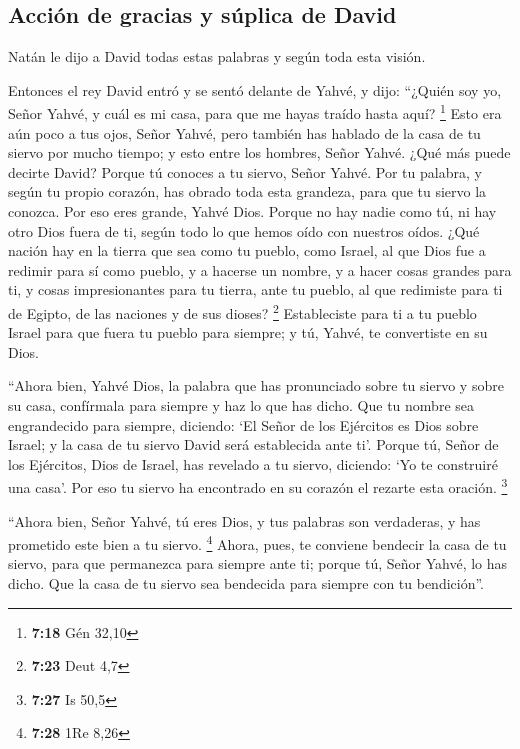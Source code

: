 \hypertarget{acciuxf3n-de-gracias-y-suxfaplica-de-david}{%
\subsection{Acción de gracias y súplica de
David}\label{acciuxf3n-de-gracias-y-suxfaplica-de-david}}

 Natán le dijo a David todas estas palabras y según toda
esta visión.

 Entonces el rey David entró y se sentó delante de Yahvé,
y dijo: ``¿Quién soy yo, Señor Yahvé, y cuál es mi casa, para que me
hayas traído hasta aquí? \footnote{\textbf{7:18} Gén 32,10}
 Esto era aún poco a tus ojos, Señor Yahvé, pero también
has hablado de la casa de tu siervo por mucho tiempo; y esto entre los
hombres, Señor Yahvé.  ¿Qué más puede decirte David?
Porque tú conoces a tu siervo, Señor Yahvé.  Por tu
palabra, y según tu propio corazón, has obrado toda esta grandeza, para
que tu siervo la conozca.  Por eso eres grande, Yahvé
Dios. Porque no hay nadie como tú, ni hay otro Dios fuera de ti, según
todo lo que hemos oído con nuestros oídos.  ¿Qué nación
hay en la tierra que sea como tu pueblo, como Israel, al que Dios fue a
redimir para sí como pueblo, y a hacerse un nombre, y a hacer cosas
grandes para ti, y cosas impresionantes para tu tierra, ante tu pueblo,
al que redimiste para ti de Egipto, de las naciones y de sus dioses?
\footnote{\textbf{7:23} Deut 4,7}  Estableciste para ti a
tu pueblo Israel para que fuera tu pueblo para siempre; y tú, Yahvé, te
convertiste en su Dios.

 ``Ahora bien, Yahvé Dios, la palabra que has pronunciado
sobre tu siervo y sobre su casa, confírmala para siempre y haz lo que
has dicho.  Que tu nombre sea engrandecido para siempre,
diciendo: `El Señor de los Ejércitos es Dios sobre Israel; y la casa de
tu siervo David será establecida ante ti'.  Porque tú,
Señor de los Ejércitos, Dios de Israel, has revelado a tu siervo,
diciendo: `Yo te construiré una casa'. Por eso tu siervo ha encontrado
en su corazón el rezarte esta oración. \footnote{\textbf{7:27} Is 50,5}

 ``Ahora bien, Señor Yahvé, tú eres Dios, y tus palabras
son verdaderas, y has prometido este bien a tu siervo. \footnote{\textbf{7:28}
  1Re 8,26}  Ahora, pues, te conviene bendecir la casa de
tu siervo, para que permanezca para siempre ante ti; porque tú, Señor
Yahvé, lo has dicho. Que la casa de tu siervo sea bendecida para siempre
con tu bendición''.

